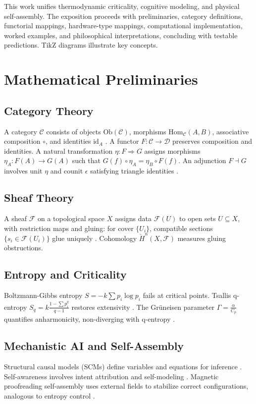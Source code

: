 \documentclass{article}
\theoremstyle{plain}
\theoremstyle{definition}
\begin{document}
This work unifies thermodynamic criticality, cognitive modeling, and physical self-assembly. The exposition proceeds with preliminaries, category definitions, functorial mappings, hardware-type mappings, computational implementation, worked examples, and philosophical interpretations, concluding with testable predictions. TikZ diagrams illustrate key concepts.

\section{Mathematical Preliminaries}

\subsection{Category Theory}
A category $\mathcal{C}$ consists of objects $\text{Ob}(\mathcal{C})$, morphisms $\text{Hom}_{\mathcal{C}}(A, B)$, associative composition $\circ$, and identities $\text{id}_A$ \cite{Awodey2010,Lawvere2009}. A functor $F: \mathcal{C} \to \mathcal{D}$ preserves composition and identities. A natural transformation $\eta: F \Rightarrow G$ assigns morphisms $\eta_A: F(A) \to G(A)$ such that $G(f) \circ \eta_A = \eta_B \circ F(f)$. An adjunction $F \dashv G$ involves unit $\eta$ and counit $\epsilon$ satisfying triangle identities \cite{Spivak2014}.

\subsection{Sheaf Theory}
A sheaf $\mathcal{F}$ on a topological space $X$ assigns data $\mathcal{F}(U)$ to open sets $U \subseteq X$, with restriction maps and gluing: for cover $\{U_i\}$, compatible sections $\{s_i \in \mathcal{F}(U_i)\}$ glue uniquely \cite{MacLane1992,Bredon1997}. Cohomology $\check{H}^n(X, \mathcal{F})$ measures gluing obstructions.

\subsection{Entropy and Criticality}
Boltzmann-Gibbs entropy $S = -k \sum p_i \log p_i$ fails at critical points. Tsallis q-entropy $S_q = k \frac{1 - \sum p_i^q}{q-1}$ restores extensivity \cite{Tsallis1988}. The Gr\"uneisen parameter $\Gamma = \frac{\alpha}{C_p}$ quantifies anharmonicity, non-diverging with q-entropy \cite{Soares2023prb,Soares2024}.

\subsection{Mechanistic AI and Self-Assembly}
Structural causal models (SCMs) define variables and equations for inference \cite{Pearl2009}. Self-awareness involves intent attribution and self-modeling \cite{Bennett2025,Goguen1992}. Magnetic proofreading self-assembly uses external fields to stabilize correct configurations, analogous to entropy control \cite{Liang2025}.
\end{document}
